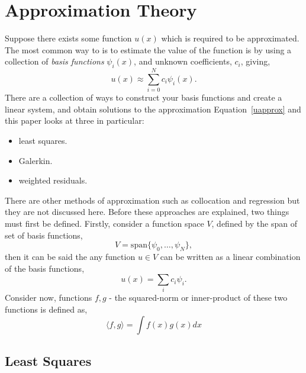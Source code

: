 \section{Approximation Theory}

Suppose there exists some function $u(x)$ which is required to be approximated. The most common way to is to estimate the value of the function is by using a collection of \textit{basis functions} $\psi_i(x)$, and unknown coefficients, $c_i$, giving,
\begin{equation}\label{uapprox}
	u(x) \approx \sum_{i=0}^N c_i\psi_i(x).
\end{equation}
There are a collection of ways to construct your basis functions and create a linear system, and obtain solutions to the approximation Equation~\eqref{uapprox} and this paper looks at three in particular:
\begin{itemize}
	\item least squares.
	\item Galerkin.
	\item weighted residuals.
\end{itemize}
There are other methods of approximation such as collocation and regression but they are not discussed here. Before these approaches are explained, two things must first be defined. Firstly, consider a function space $V$, defined by the span of set of basis functions,
\begin{equation}
	V = \text{span}\{\psi_0,\dots,\psi_N\},
\end{equation}
then it can be said the any function $u\in V$ can be written as a linear combination of the basis functions,
	\begin{equation}\label{basis}
		u(x) = \sum_i c_i \psi_i. 
	\end{equation}
Consider now, functions $f,g$ - the squared-norm or inner-product of these two functions is defined as,
\begin{equation}\label{innerprod}
	\langle f,g\rangle = \int f(x)g(x)dx
\end{equation}

\subsection{Least Squares}

